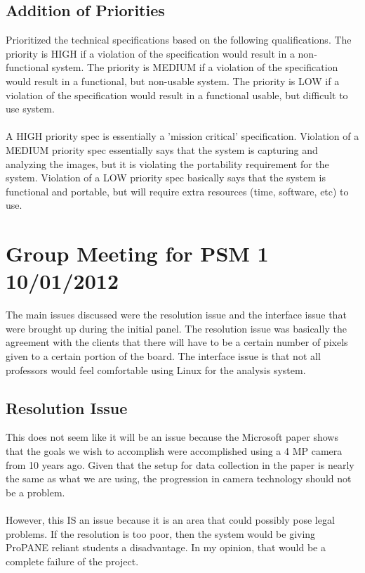 \documentclass[]{article}
\begin{document}
		\subsection{Addition of Priorities}
			Prioritized the technical specifications based on the following qualifications. The priority is HIGH if a violation of the specification would result in a non-functional system. The priority is MEDIUM if a violation of the specification would result in a functional, but non-usable system. The priority is LOW if a violation of the specification would result in a functional usable, but difficult to use system. \\
			\\
			A HIGH priority spec is essentially a 'mission critical' specification. Violation of a MEDIUM priority spec essentially says that the system is capturing and analyzing the images, but it is violating the portability requirement for the system. Violation of a LOW priority spec basically says that the system is functional and portable, but will require extra resources (time, software, etc) to use.
			
	\section{Group Meeting for PSM 1 10/01/2012}
		The main issues discussed were the resolution issue and the interface issue that were brought up during the initial panel. The resolution issue was basically the agreement with the clients that there will have to be a certain number of pixels given to a certain portion of the board. The interface issue is that not all professors would feel comfortable using Linux for the analysis system. 
		
		\subsection{Resolution Issue}
			This does not seem like it will be an issue because the Microsoft paper shows that the goals we wish to accomplish were accomplished using a 4 MP camera from 10 years ago. Given that the setup for data collection in the paper is nearly the same as what we are using, the progression in camera technology should not be a problem.\\
			\\
			However, this IS an issue because it is an area that could possibly pose legal problems. If the resolution is too poor, then the system would be giving ProPANE reliant students a disadvantage. In my opinion, that would be a complete failure of the project.
			
\end{document}
